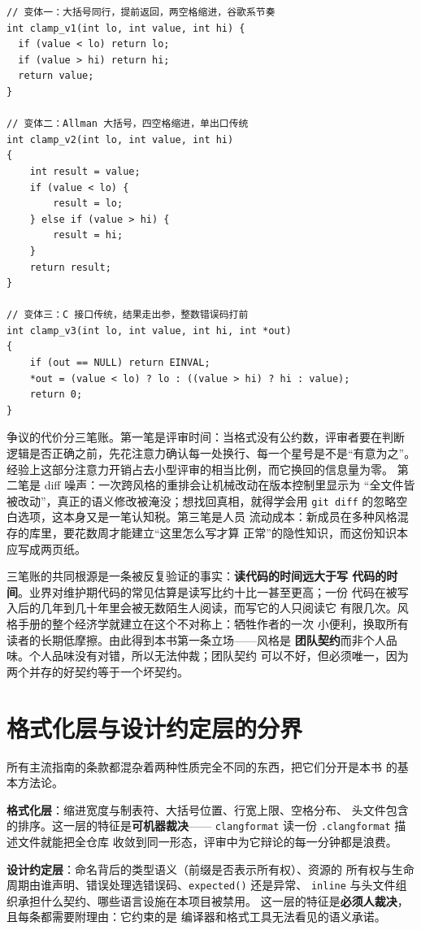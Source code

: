 \documentclass[12pt,a4paper,fontset=fandol]{ctexbook}
\newcommand{\Fn}[1]{\texttt{#1()}}
\newcommand{\Tp}[1]{\texttt{#1}}
\newcommand{\Bk}{\discretionary{}{}{}}
\begin{document}
\begin{lstlisting}[style=cppstyle,caption={同一个求限制函数的三种写法：各自皆合法，风格互不相容},label={lst:ch01-variants}]
// 变体一：大括号同行，提前返回，两空格缩进，谷歌系节奏
int clamp_v1(int lo, int value, int hi) {
  if (value < lo) return lo;
  if (value > hi) return hi;
  return value;
}

// 变体二：Allman 大括号，四空格缩进，单出口传统
int clamp_v2(int lo, int value, int hi)
{
    int result = value;
    if (value < lo) {
        result = lo;
    } else if (value > hi) {
        result = hi;
    }
    return result;
}

// 变体三：C 接口传统，结果走出参，整数错误码打前
int clamp_v3(int lo, int value, int hi, int *out)
{
    if (out == NULL) return EINVAL;
    *out = (value < lo) ? lo : ((value > hi) ? hi : value);
    return 0;
}
\end{lstlisting}

争议的代价分三笔账。第一笔是评审时间：当格式没有公约数，评审者要在判断
逻辑是否正确之前，先花注意力确认每一处换行、每一个星号是不是``有意为之''。
经验上这部分注意力开销占去小型评审的相当比例，而它换回的信息量为零。
第二笔是 diff 噪声：一次跨风格的重排会让机械改动在版本控制里显示为
``全文件皆被改动''，真正的语义修改被淹没；想找回真相，就得学会用
\texttt{git\,diff} 的忽略空白选项，这本身又是一笔认知税。第三笔是人员
流动成本：新成员在多种风格混存的库里，要花数周才能建立``这里怎么写才算
正常''的隐性知识，而这份知识本应写成两页纸。

三笔账的共同根源是一条被反复验证的事实：\textbf{读代码的时间远大于写
代码的时间}。业界对维护期代码的常见估算是读写比约十比一甚至更高；一份
代码在被写入后的几年到几十年里会被无数陌生人阅读，而写它的人只阅读它
有限几次。风格手册的整个经济学就建立在这个不对称上：牺牲作者的一次
小便利，换取所有读者的长期低摩擦。由此得到本书第一条立场——风格是
\textbf{团队契约}而非个人品味。个人品味没有对错，所以无法仲裁；团队契约
可以不好，但必须唯一，因为两个并存的好契约等于一个坏契约。

\section{格式化层与设计约定层的分界}
\label{sec:ch01-twolayer}

所有主流指南的条款都混杂着两种性质完全不同的东西，把它们分开是本书
的基本方法论。

\begin{compare}[title={两层规则的分界}]
\textbf{格式化层}：缩进宽度与制表符、大括号位置、行宽上限、空格分布、
头文件包含的排序。这一层的特征是\textbf{可机器裁决}——
\Tp{clang{\Bk}format} 读一份 \Tp{.clang{\Bk}format} 描述文件就能把全仓库
收敛到同一形态，评审中为它辩论的每一分钟都是浪费。\par\medskip
\textbf{设计约定层}：命名背后的类型语义（前缀是否表示所有权）、资源的
所有权与生命周期由谁声明、错误处理选错误码、\Fn{expected} 还是异常、
\Tp{inline} 与头文件组织承担什么契约、哪些语言设施在本项目被禁用。
这一层的特征是\textbf{必须人裁决}，且每条都需要附理由：它约束的是
编译器和格式工具无法看见的语义承诺。
\end{compare}
\end{document}
